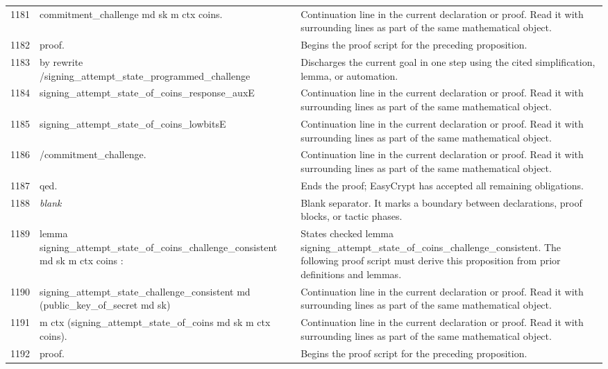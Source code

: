 \documentclass[10pt]{article}
\begin{document}
\begin{longtable}{r L{0.53\textwidth} L{0.37\textwidth}}
1181 & {\ttfamily\scriptsize   commitment\_challenge md sk m ctx coins.} & Continuation line in the current declaration or proof.  Read it with surrounding lines as part of the same mathematical object. \\
1182 & {\ttfamily\scriptsize proof.} & Begins the proof script for the preceding proposition. \\
1183 & {\ttfamily\scriptsize by rewrite /signing\_attempt\_state\_programmed\_challenge} & Discharges the current goal in one step using the cited simplification, lemma, or automation. \\
1184 & {\ttfamily\scriptsize            signing\_attempt\_state\_of\_coins\_response\_auxE} & Continuation line in the current declaration or proof.  Read it with surrounding lines as part of the same mathematical object. \\
1185 & {\ttfamily\scriptsize            signing\_attempt\_state\_of\_coins\_lowbitsE} & Continuation line in the current declaration or proof.  Read it with surrounding lines as part of the same mathematical object. \\
1186 & {\ttfamily\scriptsize            /commitment\_challenge.} & Continuation line in the current declaration or proof.  Read it with surrounding lines as part of the same mathematical object. \\
1187 & {\ttfamily\scriptsize qed.} & Ends the proof; EasyCrypt has accepted all remaining obligations. \\
1188 & {\ttfamily\scriptsize \emph{blank}} & Blank separator.  It marks a boundary between declarations, proof blocks, or tactic phases. \\
1189 & {\ttfamily\scriptsize lemma signing\_attempt\_state\_of\_coins\_challenge\_consistent md sk m ctx coins :} & States checked lemma signing\_attempt\_state\_of\_coins\_challenge\_consistent.  The following proof script must derive this proposition from prior definitions and lemmas. \\
1190 & {\ttfamily\scriptsize   signing\_attempt\_state\_challenge\_consistent md (public\_key\_of\_secret md sk)} & Continuation line in the current declaration or proof.  Read it with surrounding lines as part of the same mathematical object. \\
1191 & {\ttfamily\scriptsize     m ctx (signing\_attempt\_state\_of\_coins md sk m ctx coins).} & Continuation line in the current declaration or proof.  Read it with surrounding lines as part of the same mathematical object. \\
1192 & {\ttfamily\scriptsize proof.} & Begins the proof script for the preceding proposition. \\

\end{longtable}
\end{document}
